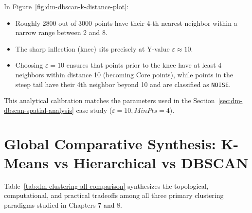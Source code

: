 In Figure~\ref{fig:dm-dbscan-k-distance-plot}:
\begin{itemize}
    \item Roughly 2800 out of 3000 points have their 4-th nearest neighbor within a narrow range between 2 and 8.
    \item The sharp inflection (knee) sits precisely at Y-value $\varepsilon \approx 10$.
    \item Choosing $\varepsilon = 10$ ensures that points prior to the knee have at least 4 neighbors within distance 10 (becoming Core points), while points in the steep tail have their 4th neighbor beyond 10 and are classified as \texttt{NOISE}.
\end{itemize}
This analytical calibration matches the parameters used in the Section~\ref{sec:dm-dbscan-spatial-analysis} case study ($\varepsilon = 10, MinPts = 4$).

\section{Global Comparative Synthesis: K-Means vs Hierarchical vs DBSCAN}
\label{sec:dm-clustering-comprehensive-comparison}

Table~\ref{tab:dm-clustering-all-comparison} synthesizes the topological, computational, and practical tradeoffs among all three primary clustering paradigms studied in Chapters 7 and 8.

